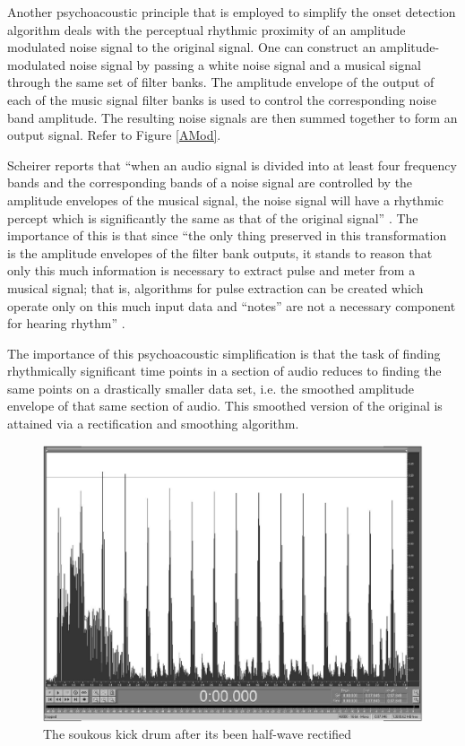 Another psychoacoustic principle that is employed to simplify 
the onset detection algorithm deals with the perceptual rhythmic 
proximity of an amplitude modulated noise signal to the original signal. 
One can construct an amplitude-modulated noise signal by passing 
a white noise signal and a musical signal through the same set of 
filter banks. The amplitude envelope of the output of each of the 
music signal filter banks is used to control the corresponding noise 
band amplitude. The resulting noise signals are then summed together
to form an output signal. Refer to Figure \ref{AMod}.

Scheirer reports that ``when an audio signal is divided into  
at least four frequency bands and the corresponding bands of a 
noise signal are controlled by the amplitude envelopes of the 
musical signal, the noise signal will have a rhythmic percept 
which is significantly the same as that of the original signal'' \cite{Scheirer:98tempo}. 
The importance of this is that since ``the only thing preserved in this
transformation is the amplitude envelopes of the filter bank outputs,
it stands to reason that only this much information is necessary to
extract pulse and meter from a musical signal; that is, algorithms for
pulse extraction can be created which operate only on this much input
data and ``notes'' are not a necessary component for hearing rhythm'' \cite{Scheirer:98tempo}. 

The importance of this psychoacoustic simplification is that the
task of finding rhythmically significant time points in a section of
audio reduces to finding the same points on a drastically smaller data
set, i.e. the smoothed amplitude envelope of that same section of
audio. This smoothed version of the original is attained via a
rectification and smoothing algorithm.

\begin{landscape}
  \begin{figure}
    \centering
    \includegraphics[width=7in]{ZingZongKickRectified.pdf}
    \caption{The soukous kick drum after its been half-wave rectified}
    \label{kickrect}
  \end{figure}
\end{landscape}

